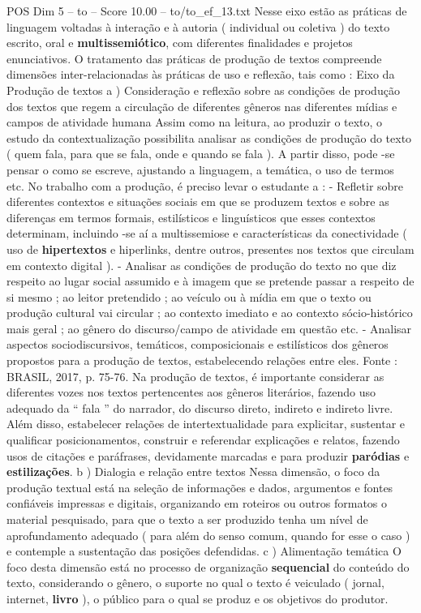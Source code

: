 \begin{textsample}{POS Dim 5 – to – Score 10.00 – to/to\_ef\_13.txt}  \label{ex:f5_pos_028}
Nesse eixo estão as práticas de linguagem voltadas à interação e à autoria ( individual ou coletiva ) do texto escrito, oral e \textbf{multissemiótico}, com diferentes finalidades e projetos enunciativos.
O tratamento das práticas de produção de textos compreende dimensões inter-relacionadas às práticas de uso e reflexão, tais como : Eixo da Produção de textos a ) Consideração e reflexão sobre as condições de produção dos textos que regem a circulação de diferentes gêneros nas diferentes mídias e campos de atividade humana Assim como na leitura, ao produzir o texto, o estudo da contextualização possibilita analisar as condições de produção do texto ( quem fala, para que se fala, onde e quando se fala ).
A partir disso, pode -se pensar o como se escreve, ajustando a linguagem, a temática, o uso de termos etc.
No trabalho com a produção, é preciso levar o estudante a : - Refletir sobre diferentes contextos e situações sociais em que se produzem textos e sobre as diferenças em termos formais, estilísticos e linguísticos que esses contextos determinam, incluindo -se aí a multissemiose e características da conectividade ( uso de \textbf{hipertextos} e hiperlinks, dentre outros, presentes nos textos que circulam em contexto digital ). - Analisar as condições de produção do texto no que diz respeito ao lugar social assumido e à imagem que se pretende passar a respeito de si mesmo ; ao leitor pretendido ; ao veículo ou à mídia em que o texto ou produção cultural vai circular ; ao contexto imediato e ao contexto sócio-histórico mais geral ; ao gênero do discurso/campo de atividade em questão etc. - Analisar aspectos sociodiscursivos, temáticos, composicionais e estilísticos dos gêneros propostos para a produção de textos, estabelecendo relações entre eles.
Fonte : BRASIL, 2017, p. 75-76.
Na produção de textos, é importante considerar as diferentes vozes nos textos pertencentes aos gêneros literários, fazendo uso adequado da “ fala ” do narrador, do discurso direto, indireto e indireto livre.
Além disso, estabelecer relações de intertextualidade para explicitar, sustentar e qualificar posicionamentos, construir e referendar explicações e relatos, fazendo usos de citações e paráfrases, devidamente marcadas e para produzir \textbf{paródias} e \textbf{estilizações}. b ) Dialogia e relação entre textos Nessa dimensão, o foco da produção textual está na seleção de informações e dados, argumentos e fontes confiáveis impressas e digitais, organizando em roteiros ou outros formatos o material pesquisado, para que o texto a ser produzido tenha um nível de aprofundamento adequado ( para além do senso comum, quando for esse o caso ) e contemple a sustentação das posições defendidas. c ) Alimentação temática O foco desta dimensão está no processo de organização \textbf{sequencial} do conteúdo do texto, considerando o gênero, o suporte no qual o texto é veiculado ( jornal, internet, \textbf{livro} ), o público para o qual se produz e os objetivos do produtor.

\end{textsample}
